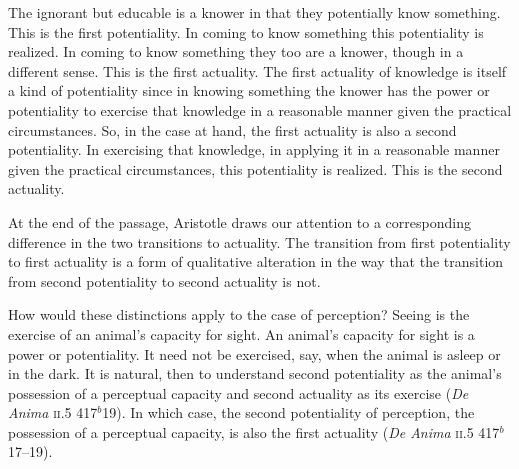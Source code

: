 The ignorant but educable is a knower in that they potentially know something. This is the first potentiality. In coming to know something this potentiality is realized. In coming to know something they too are a knower, though in a different sense. This is the first actuality. The first actuality of knowledge is itself a kind of potentiality since in knowing something the knower has the power or potentiality to exercise that knowledge in a reasonable manner given the practical circumstances. So, in the case at hand, the first actuality is also a second potentiality. In exercising that knowledge, in applying it in a reasonable manner given the practical circumstances, this potentiality is realized. This is the second actuality. 

At the end of the passage, Aristotle draws our attention to a corresponding difference in the two transitions to actuality. The transition from first potentiality to first actuality is a form of qualitative alteration in the way that the transition from second potentiality to second actuality is not.

How would these distinctions apply to the case of perception? Seeing is the exercise of an animal's capacity for sight. An animal's capacity for sight is a power or potentiality. It need not be exercised, say, when the animal is asleep or in the dark. It is natural, then to understand second potentiality as the animal's possession of a perceptual capacity and second actuality as its exercise (\emph{De Anima} \textsc{ii}.5 417\( ^{b} \)19). In which case, the second potentiality of perception, the possession of a perceptual capacity, is also the first actuality (\emph{De Anima} \textsc{ii}.5 417\( ^{b} \)17--19). 
% 

